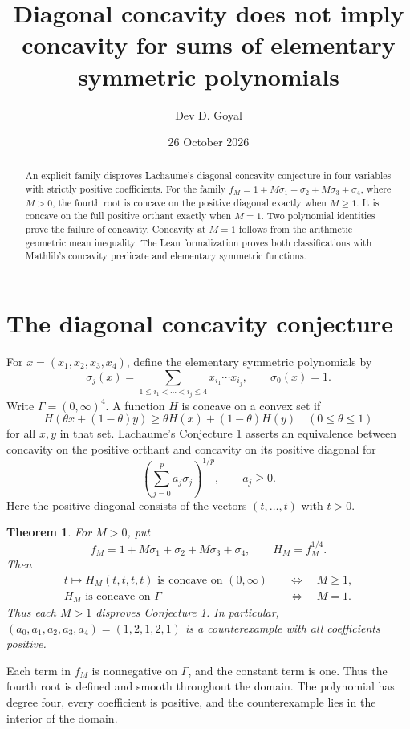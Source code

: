 \documentclass[11pt,a4paper]{article}
\title{Diagonal concavity does not imply concavity for sums of elementary symmetric polynomials}
\author{Dev D. Goyal}
\date{26 October 2026}
\newtheorem{theorem}{Theorem}
\begin{document}
\maketitle
\begin{abstract}
An explicit family disproves Lachaume's diagonal concavity conjecture in four variables with strictly positive coefficients. For the family $f_M=1+M\sigma_1+\sigma_2+M\sigma_3+\sigma_4$, where $M>0$, the fourth root is concave on the positive diagonal exactly when $M\geq1$. It is concave on the full positive orthant exactly when $M=1$. Two polynomial identities prove the failure of concavity. Concavity at $M=1$ follows from the arithmetic--geometric mean inequality. The Lean formalization proves both classifications with Mathlib's concavity predicate and elementary symmetric functions.
\end{abstract}

\section{The diagonal concavity conjecture}
For $x=(x_1,x_2,x_3,x_4)$, define the elementary symmetric polynomials by
\[
 \sigma_j(x)=\sum_{1\leq i_1<\cdots<i_j\leq4}x_{i_1}\cdots x_{i_j},
 \qquad \sigma_0(x)=1.
\]
Write $\Gamma=(0,\infty)^4$. A function $H$ is concave on a convex set if
\[
 H(\theta x+(1-\theta)y)\geq\theta H(x)+(1-\theta)H(y)
 \quad(0\leq\theta\leq1)
\]
for all $x,y$ in that set.
Lachaume's Conjecture 1 \cite{lachaume} asserts an equivalence between concavity on the positive orthant and concavity on its positive diagonal for
\[
 \left(\sum_{j=0}^p a_j\sigma_j\right)^{1/p},\qquad a_j\geq0.
\]
Here the positive diagonal consists of the vectors $(t,\ldots,t)$ with $t>0$.

\begin{theorem}\label{thm:classification}
For $M>0$, put
\[
 f_M=1+M\sigma_1+\sigma_2+M\sigma_3+\sigma_4,
 \qquad H_M=f_M^{1/4}.
\]
Then
\begin{align*}
 t\longmapsto H_M(t,t,t,t)\text{ is concave on }(0,\infty)
 &\quad\Longleftrightarrow\quad M\geq1,\\
 H_M\text{ is concave on }\Gamma
 &\quad\Longleftrightarrow\quad M=1.
\end{align*}
Thus each $M>1$ disproves Conjecture 1. In particular, $(a_0,a_1,a_2,a_3,a_4)=(1,2,1,2,1)$ is a counterexample with all coefficients positive.
\end{theorem}
Each term in $f_M$ is nonnegative on $\Gamma$, and the constant term is one. Thus the fourth root is defined and smooth throughout the domain. The polynomial has degree four, every coefficient is positive, and the counterexample lies in the interior of the domain.
\end{document}
